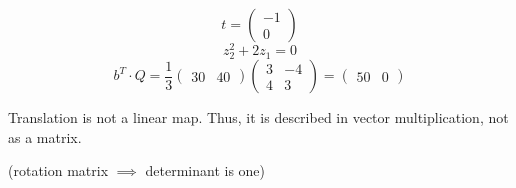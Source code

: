 \documentclass[a4paper]{article}
\theoremstyle{definition}
\begin{document}
\[ t = \begin{pmatrix} -1 \\ 0 \end{pmatrix} \]
\[ z_2^2 + 2z_1 = 0 \]
\[ b^T \cdot Q = \frac13 \begin{pmatrix} 30 & 40 \end{pmatrix} \begin{pmatrix} 3 & -4 \\ 4 & 3 \end{pmatrix} = \begin{pmatrix} 50 & 0 \end{pmatrix} \]

Translation is not a linear map. Thus, it is described in vector multiplication, not as a matrix.

(rotation matrix $\implies$ determinant is one)
\end{document}
